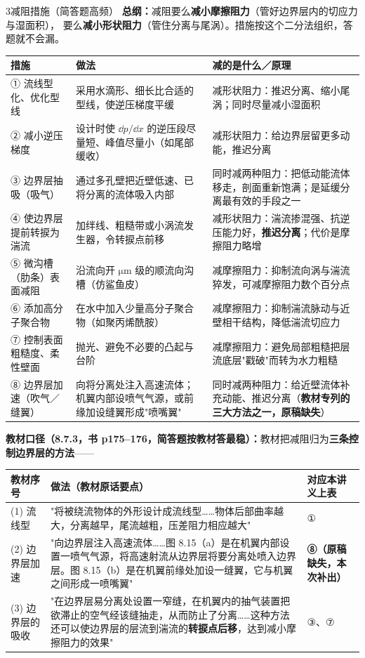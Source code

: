 \begin{kaodian}{3}{减阻措施（简答题高频）}
\textbf{总纲：}减阻要么\textbf{减小摩擦阻力}（管好边界层内的切应力与湿面积），
要么\textbf{减小形状阻力}（管住分离与尾涡）。措施按这个二分法组织，答题就不会漏。

\begin{center}
\begin{tabularx}{\textwidth}{@{}lXX@{}}
\toprule
措施 & 做法 & 减的是什么／原理 \\
\midrule
① 流线型化、优化型线 & 采用水滴形、细长比合适的型线，使逆压梯度平缓 &
减形状阻力：推迟分离、缩小尾涡；同时尽量减小湿面积 \\
② 减小逆压梯度 & 设计时使 $\dd p/\dd x$ 的逆压段尽量短、峰值尽量小（如尾部缓收） &
减形状阻力：给边界层留更多动能，推迟分离 \\
③ 边界层抽吸（吸气） & 通过多孔壁把近壁低速、已将分离的流体吸入内部 &
同时减两种阻力：把低动能流体移走，剖面重新饱满；是延缓分离最有效的手段之一 \\
④ 使边界层提前转捩为湍流 & 加绊线、粗糙带或小涡流发生器，令转捩点前移 &
减形状阻力：湍流掺混强、抗逆压能力好，\textbf{推迟分离}；代价是摩擦阻力略增 \\
⑤ 微沟槽（肋条）表面减阻 & 沿流向开 $\mathrm{\mu m}$ 级的顺流向沟槽（仿鲨鱼皮） &
减摩擦阻力：抑制流向涡与湍流猝发，可减摩擦阻力数个百分点 \\
⑥ 添加高分子聚合物 & 在水中加入少量高分子聚合物（如聚丙烯酰胺） &
减摩擦阻力：抑制湍流脉动与近壁相干结构，降低湍流切应力 \\
⑦ 控制表面粗糙度、柔性壁面 & 抛光、避免不必要的凸起与台阶 &
减摩擦阻力：避免局部粗糙把层流底层"戳破"而转为水力粗糙 \\
⑧ 边界层加速（吹气／缝翼） & 向将分离处注入高速流体；机翼内部设喷气气源，或前缘加设缝翼形成"喷嘴翼" &
同时减两种阻力：给近壁流体补充动能、推迟分离（\textbf{教材专列的三大方法之一，原稿缺失}） \\
\bottomrule
\end{tabularx}
\end{center}

\textbf{教材口径（8.7.3，书 p175--176，简答题按教材答最稳）：}教材把减阻归为\textbf{三条控制边界层的方法}——
\begin{center}
\begin{tabularx}{\textwidth}{@{}lXX@{}}
\toprule
教材序号 & 做法（教材原话要点） & 对应本讲义上表 \\
\midrule
(1) 流线型 & "将被绕流物体的外形设计成流线型……物体后部曲率越大，分离越早，尾流越粗，压差阻力相应越大" &
① \\
(2) 边界层加速 & "向边界层注入高速流体……图 8.15（a）是在机翼内部设置一喷气气源，将高速射流从边界层将要分离处喷入边界层。图 8.15（b）是在机翼前缘处加设一缝翼，它与机翼之间形成一喷嘴翼" &
\textbf{⑧（原稿缺失，本次补出）} \\
(3) 边界层的吸收 & "在边界层易分离处设置一窄缝，在机翼内的抽气装置把欲滞止的空气经该缝抽走，从而防止了分离……这种方法还可以使边界层的层流到湍流的\textbf{转捩点后移}，达到减小摩擦阻力的效果" &
③、⑦ \\
\bottomrule
\end{tabularx}
\end{center}


\end{kaodian}
